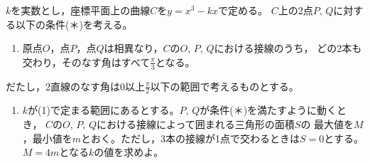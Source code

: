 \documentclass[../../main.tex]{subfiles}
\begin{document}
$k$を実数とし，座標平面上の曲線$C$を$y=x^3-kx$で定める。
$C$上の2点$P, \, Q$に対する以下の条件(＊)を考える。
\begin{enumerate}
  \item[条件(＊)]原点$O$，点$P$，点$Q$は相異なり，$C$の$O, \, P, \, Q$における接線のうち，
    どの2本も交わり，そのなす角はすべて$\displaystyle\frac{\pi}{3}$となる。
\end{enumerate}
だたし，2直線のなす角は0以上$\displaystyle\frac{\pi}{2}$以下の範囲で考えるものとする。
\begin{enumerate}
  (＊)を満たす$P, \, Q$が存在するような$k$の範囲を求めよ。
  \item$k$が(1)で定まる範囲にあるとする。$P, \, Q$が条件(＊)を満たすように動くとき，
    $C$の$O, \, P, \, Q$における接線によって囲まれる三角形の面積$S$の
    最大値を$M$，最小値を$m$とおく。ただし，3本の接線が1点で交わるときは$S=0$とする。
    $M=4m$となる$k$の値を求めよ。
\end{enumerate}
\end{document}
